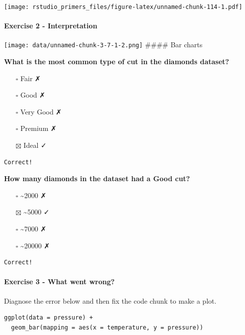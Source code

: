 \documentclass[
]{article}
\providecommand{\tightlist}{%
  \setlength{\itemsep}{0pt}\setlength{\parskip}{0pt}}
\begin{document}
\texttt{[image: rstudio\_primers\_files/figure-latex/unnamed-chunk-114-1.pdf]}

\hypertarget{exercise-2---interpretation}{%
\paragraph{Exercise 2 -
Interpretation}\label{exercise-2---interpretation}}

\texttt{[image: data/unnamed-chunk-3-7-1-2.png]} \#\#\#\# Bar charts

\textbf{What is the most common type of cut in the diamonds dataset?}

\begin{itemize}
\tightlist
\item[$\square$]
  Fair ✗
\item[$\square$]
  Good ✗
\item[$\square$]
  Very Good ✗
\item[$\square$]
  Premium ✗
\item[$\boxtimes$]
  Ideal ✓
\end{itemize}

\begin{verbatim}
Correct!
\end{verbatim}

\textbf{How many diamonds in the dataset had a Good cut?}

\begin{itemize}
\tightlist
\item[$\square$]
  \textasciitilde2000 ✗
\item[$\boxtimes$]
  \textasciitilde5000 ✓
\item[$\square$]
  \textasciitilde7000 ✗
\item[$\square$]
  \textasciitilde20000 ✗
\end{itemize}

\begin{verbatim}
Correct!
\end{verbatim}

\hypertarget{exercise-3---what-went-wrong}{%
\paragraph{Exercise 3 - What went
wrong?}\label{exercise-3---what-went-wrong}}

Diagnose the error below and then fix the code chunk to make a plot.

\begin{verbatim}
ggplot(data = pressure) +
  geom_bar(mapping = aes(x = temperature, y = pressure))
\end{verbatim}
\end{document}
